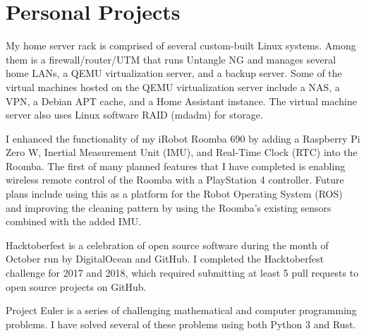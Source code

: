 \documentclass[letterpaper,10pt]{article}
\begin{document}
    \section*{Personal Projects}
        \begin{description}[style=nextline]
            \item [Servers] My home server rack is comprised of several custom-built Linux systems. Among them is a firewall/router/UTM that runs Untangle NG and manages several home LANs, a QEMU virtualization server, and a backup server. Some of the virtual machines hosted on the QEMU virtualization server include a NAS, a VPN, a Debian APT cache, and a Home Assistant instance. The virtual machine server also uses Linux software RAID (mdadm) for storage.
            \item [Roomba RPi] I enhanced the functionality of my iRobot Roomba 690 by adding a Raspberry Pi Zero W, Inertial Measurement Unit (IMU), and Real-Time Clock (RTC) into the Roomba. The first of many planned features that I have completed is enabling wireless remote control of the  Roomba with a PlayStation 4 controller. Future plans include using this as a platform for the Robot Operating System (ROS) and improving the cleaning pattern by using the Roomba's existing sensors combined with the added IMU.
            \item [Hacktoberfest] Hacktoberfest is a celebration of open source software during the month of October run by DigitalOcean and GitHub. I completed the Hacktoberfest challenge for 2017 and 2018, which required submitting at least 5 pull requests to open source projects on GitHub.
            \item [Project Euler] Project Euler is a series of challenging mathematical and computer programming problems. I have solved several of these problems using both Python 3 and Rust.
        \end{description}
\end{document}

